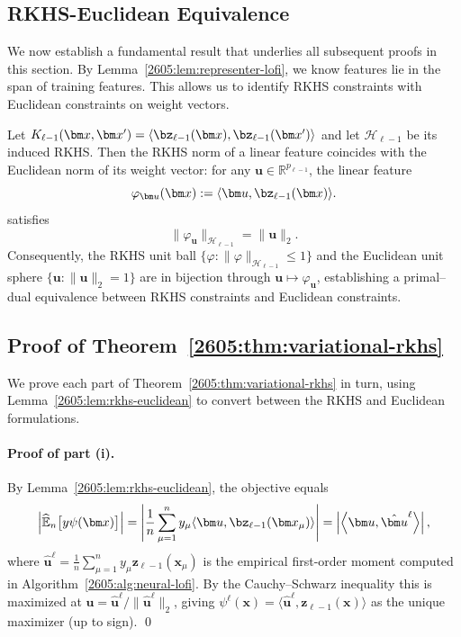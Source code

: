 \subsection{RKHS-Euclidean Equivalence}\label{2605:app:kernel-equiv}

We now establish a fundamental result that underlies all subsequent proofs in this section. By Lemma~\ref{2605:lem:representer-lofi}, we know features lie in the span of training features. This allows us to identify RKHS constraints with Euclidean constraints on weight vectors.

\begin{lemma}\label{2605:lem:rkhs-euclidean}
Let $K_{\ell-1}(\bm x,\bm x')=\langle\bz_{\ell-1}(\bm x),\bz_{\ell-1}(\bm x')\rangle$ and let $\mathcal H_{\ell-1}$ be its induced RKHS. Then the RKHS norm of a linear feature coincides with the Euclidean norm of its weight vector: for any $\bm u\in\mathbb R^{p_{\ell-1}}$, the linear feature
\[
    \varphi_{\bm u}({\bm x}) := \langle \bm u, \bz_{\ell-1}(\bm x)\rangle.
\]
satisfies
\[
    \|\varphi_{\bm u}\|_{\mathcal H_{\ell-1}} = \|\bm u\|_2.
\]
Consequently, the RKHS unit ball $\{\varphi:\|\varphi\|_{\mathcal H_{\ell-1}}\leq 1\}$ and the Euclidean unit sphere $\{\bm u:\|\bm u\|_2=1\}$ are in bijection through $\bm u\mapsto\varphi_{\bm u}$, establishing a primal--dual equivalence between RKHS constraints and Euclidean constraints.
\end{lemma}

\subsection{Proof of Theorem~\ref{2605:thm:variational-rkhs}}

We prove each part of Theorem~\ref{2605:thm:variational-rkhs} in turn, using Lemma~\ref{2605:lem:rkhs-euclidean} to convert between the RKHS and Euclidean formulations.

\paragraph{Proof of part (i).}

By Lemma~\ref{2605:lem:rkhs-euclidean}, the objective equals
\[
    \left|\widehat{\mathbb E}_n\bigl[y \psi(\bm x)\bigr]\right|
    =
    \left|\frac{1}{n}\sum_{\mu=1}^n y_\mu\langle \bm u, \bz_{\ell-1}(\bm x_\mu)\rangle\right|
    =
    \left|\left\langle \bm u,  \hat{\bm u}^\ell\right\rangle\right|,
\]
where $\hat{\bm u}^\ell = \tfrac{1}{n}\sum_{\mu=1}^n y_\mu \bm z_{\ell-1}(\bm x_\mu)$ is the empirical first-order moment computed in Algorithm~\ref{2605:alg:neural-lofi}. By the Cauchy--Schwarz inequality this is maximized at $\bm u = \hat{\bm u}^\ell/\|\hat{\bm u}^\ell\|_2$, giving $\psi^\ell(\bm x)=\langle \hat{\bm u}^\ell, \bm z_{\ell-1}(\bm x)\rangle$ as the unique maximizer (up to sign). \qed

